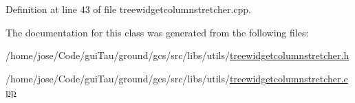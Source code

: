 Definition at line 43 of file treewidgetcolumnstretcher.\-cpp.



The documentation for this class was generated from the following files\-:\begin{DoxyCompactItemize}
\item 
/home/jose/\-Code/gui\-Tau/ground/gcs/src/libs/utils/\hyperlink{treewidgetcolumnstretcher_8h}{treewidgetcolumnstretcher.\-h}\item 
/home/jose/\-Code/gui\-Tau/ground/gcs/src/libs/utils/\hyperlink{treewidgetcolumnstretcher_8cpp}{treewidgetcolumnstretcher.\-cpp}\end{DoxyCompactItemize}
